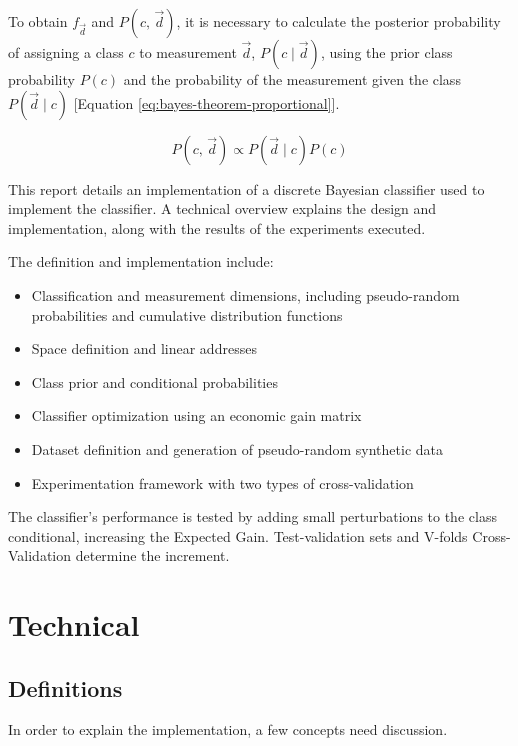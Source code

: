\documentclass[letterpaper, conference]{IEEEtran}
\begin{document}
To obtain $f_{\vec{d}}$ and $P(c,\, \vec{d})$, it is necessary to calculate the posterior probability of assigning a class $c$ to measurement $\vec{d}$, $P(c \mid \vec{d})$, using the prior class probability $P(c)$ and the probability of the measurement given the class $P(\vec{d} \mid c)$ [Equation \ref{eq:bayes-theorem-proportional}].

\begin{equation} \label{eq:bayes-theorem-proportional}
  P(c,\, \vec{d}) \mathbin{\propto} P(\vec{d} \mid c) \mathbin{} P(c)
\end{equation}

This report details an implementation of a discrete Bayesian classifier used to implement the classifier. A technical overview explains the design and implementation, along with the results of the experiments executed.

The definition and implementation include:

\begin{itemize}
  \item Classification and measurement dimensions, including pseudo-random probabilities and cumulative distribution functions
  \item Space definition and linear addresses
  \item Class prior and conditional probabilities
  \item Classifier optimization using an economic gain matrix
  \item Dataset definition and generation of pseudo-random synthetic data
  \item Experimentation framework with two types of cross-validation
\end{itemize}

The classifier's performance is tested by adding small perturbations to the class conditional, increasing the Expected Gain. Test-validation sets and V-folds Cross-Validation determine the increment.

\section{Technical}

\subsection{Definitions}

In order to explain the implementation, a few concepts need discussion.
\end{document}
